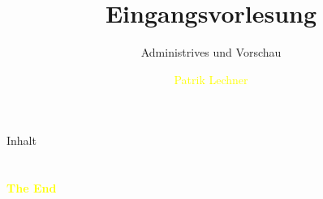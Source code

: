 \documentclass[aspectratio=43]{beamer}
\title{Eingangsvorlesung} %
\subtitle{Administrives und Vorschau}
\author[Lechner]{\textcolor{yellow}{Patrik Lechner}}
\institute[IC\textbackslash M/T]{
    \\%
    \textcolor{white}{FH St.Pölten}%
} %
\begin{document}
    
    \frame{\titlepage}
    
    \begin{frame}{Inhalt}
        \tableofcontents
    \end{frame}
        
    
    
    
    
    
    

    \section{}
    \begin{frame}{}
        \centering
            \Huge\bfseries
        \textcolor{yellow}{The End}
    \end{frame}
\end{document}
